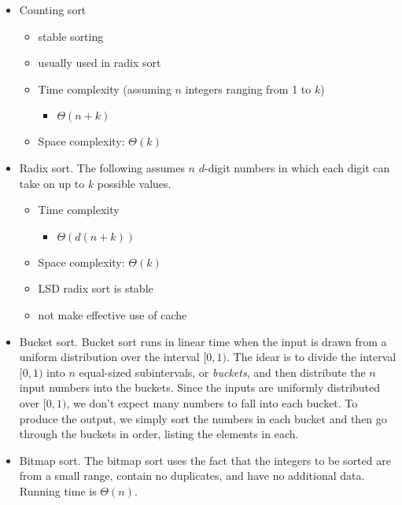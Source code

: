 \documentclass[12pt]{article}
\begin{document}
\begin{itemize}
    \item Counting sort
        \begin{itemize}
            \item stable sorting
            \item usually used in radix sort
            \item Time complexity (assuming $n$ integers ranging from 1 to $k$)
                \begin{itemize}
                    \item $\Theta(n+k)$
                \end{itemize}
            \item Space complexity: $\Theta(k)$
        \end{itemize}
    \item Radix sort.
        The following assumes $n$ $d$-digit numbers in which each digit can take on
        up to $k$ possible values.
        \begin{itemize}
            \item Time complexity
                \begin{itemize}
                    \item $\Theta(d(n+k))$
                \end{itemize}
            \item Space complexity: $\Theta(k)$
            \item LSD radix sort is stable
            \item not make effective use of cache
        \end{itemize}
    \item Bucket sort.
        Bucket sort runs in linear time when the input is drawn from a uniform
        distribution over the interval $[0, 1)$.  The idear is to divide the
        interval $[0, 1)$ into $n$ equal-sized subintervals, or {\em buckets}, and
        then distribute the $n$ input numbers into the buckets.  Since the inputs
        are uniformly distributed over $[0, 1)$, we don't expect many numbers to
        fall into each bucket.  To produce the output, we simply sort the numbers
        in each bucket and then go through the buckets in order, listing the
        elements in each.
    \item Bitmap sort.
        The bitmap sort uses the fact that the integers to be sorted are
        from a small range, contain no duplicates, and have no additional
        data.  Running time is $\Theta(n)$.
\end{itemize}
\end{document}
